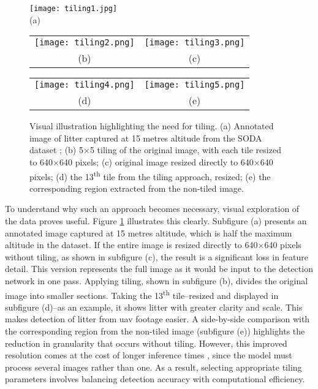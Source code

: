 \begin{figure}[!htbp]
  \centering

  \texttt{[image: tiling1.jpg]} \\
  \small (a)

  \vspace{1em}

  \begin{tabular}{cc}
    \texttt{[image: tiling2.png]} &
    \texttt{[image: tiling3.png]} \\
    \small (b) & \small (c) \\
  \end{tabular}

  \vspace{1em}

  \begin{tabular}{cc}
    \texttt{[image: tiling4.png]} &
    \texttt{[image: tiling5.png]} \\
    \small (d) & \small (e) \\
  \end{tabular}

  \caption{Visual illustration highlighting the need for tiling. (a) Annotated image of litter captured at 15 metres altitude from the SODA dataset \cite{soda_dataset}; (b) 5$\times$5 tiling of the original image, with each tile resized to 640$\times$640 pixels; (c) original image resized directly to 640$\times$640 pixels; (d) the 13\textsuperscript{th} tile from the tiling approach, resized; (e) the corresponding region extracted from the non-tiled image.}

  \label{fig:tiling_examples}
\end{figure}

To understand why such an approach becomes necessary, visual exploration of the data proves useful. Figure \ref{fig:tiling_examples} illustrates this clearly. Subfigure (a) presents an annotated image captured at 15 metres altitude, which is half the maximum altitude in the dataset. If the entire image is resized directly to 640$\times$640 pixels without tiling, as shown in subfigure (c), the result is a significant loss in feature detail. This version represents the full image as it would be input to the detection network in one pass.
Applying tiling, shown in subfigure (b), divides the original image into smaller sections. Taking the 13\textsuperscript{th} tile--resized and displayed in subfigure (d)--as an example, it shows litter with greater clarity and scale. This makes detection of litter from \gls{uav} footage easier. A side-by-side comparison with the corresponding region from the non-tiled image (subfigure (e)) highlights the reduction in granularity that occurs without tiling.
However, this improved resolution comes at the cost of longer inference times \cite{tiling}, since the model must process several images rather than one. As a result, selecting appropriate tiling parameters involves balancing detection accuracy with computational efficiency.

